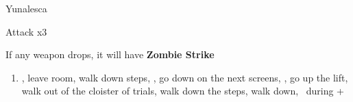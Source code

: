 \begin{battle}[132000]{Yunalesca}
    \begin{itemize}
        \summon{\bahamut}
        \bahamutf Attack x3
    \end{itemize}
    If any weapon drops, it will have \textbf{Zombie Strike}
\end{battle}
\begin{enumerate}[resume]
    \item \sd, leave room, walk down steps, \sd, go down on the next screens, \save, go up the lift, walk out of the cloister of trials, walk down the steps, walk down, \sd\ during \cs+\skippablefmv
\end{enumerate}